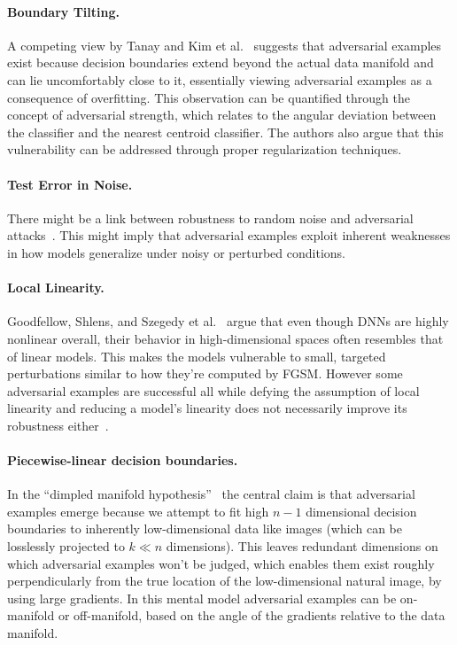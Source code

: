 \documentclass[a4paper, oneside]{discothesis}
\begin{document}
\paragraph{Boundary Tilting.} A competing view by Tanay and Kim et al.\ \cite{tanay2016boundary,kim2019bridging} suggests that adversarial examples exist because decision boundaries extend beyond the actual data manifold and can lie uncomfortably close to it, essentially viewing adversarial examples as a consequence of overfitting. This observation can be quantified through the concept of adversarial strength, which relates to the angular deviation between the classifier and the nearest centroid classifier. The authors also argue that this vulnerability can be addressed through proper regularization techniques.

\paragraph{Test Error in Noise.} There might be a link between robustness to random noise and adversarial attacks~\cite{fawzi2016robustness, lecuyer2019certified, cohen2019certified, ford2019adversarial}. This might imply that adversarial examples exploit inherent weaknesses in how models generalize under noisy or perturbed conditions.

\paragraph{Local Linearity.} Goodfellow, Shlens, and Szegedy et al.\ \cite{goodfellow2014explaining, madry2017towards} argue that even though DNNs are highly nonlinear overall, their behavior in high-dimensional spaces often resembles that of linear models. This makes the models vulnerable to small, targeted perturbations similar to how they're computed by FGSM. However some adversarial examples are successful all while defying the assumption of local linearity and reducing a model's linearity does not necessarily improve its robustness either~\cite{athalye2018obfuscated}.

\paragraph{Piecewise-linear decision boundaries.} In the ``dimpled manifold hypothesis''~\cite{shamir2021dimpled} the central claim is that adversarial examples emerge because we attempt to fit high $n-1$ dimensional decision boundaries to inherently low-dimensional data like images (which can be losslessly projected to $k \ll n$ dimensions). This leaves redundant dimensions on which adversarial examples won't be judged, which enables them exist roughly perpendicularly from the true location of the low-dimensional natural image, by using large gradients. In this mental model adversarial examples can be on-manifold or off-manifold, based on the angle of the gradients relative to the data manifold.
\end{document}
